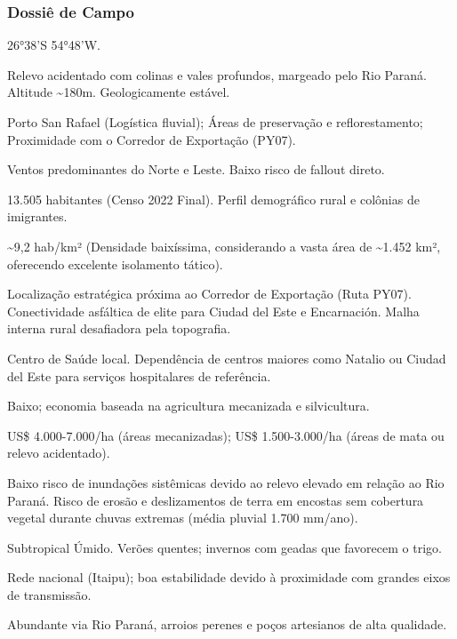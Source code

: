 \subsubsection{Dossiê de Campo}
\begin{description}[style=nextline,leftmargin=0.5cm,font=\bfseries]
\item[Coordenadas]  26°38'S 54°48'W.
\item[Topografia]  Relevo acidentado com colinas e vales profundos, margeado pelo Rio Paraná. Altitude \textasciitilde 180m. Geologicamente estável.
\item[Alvos Estratégicos]  Porto San Rafael (Logística fluvial); Áreas de preservação e reflorestamento; Proximidade com o Corredor de Exportação (PY07).
\item[Fallout]  Ventos predominantes do Norte e Leste. Baixo risco de fallout direto.
\item[População]  13.505 habitantes (Censo 2022 Final). Perfil demográfico rural e colônias de imigrantes.
\item[Densidade]  \textasciitilde 9,2 hab/\allowbreak km² (Densidade baixíssima, considerando a vasta área de \textasciitilde 1.452 km², oferecendo excelente isolamento tático).
\item[Vias de Acesso]  Localização estratégica próxima ao Corredor de Exportação (Ruta PY07). Conectividade asfáltica de elite para Ciudad del Este e Encarnación. Malha interna rural desafiadora pela topografia.
\item[Serviços]  Centro de Saúde local. Dependência de centros maiores como Natalio ou Ciudad del Este para serviços hospitalares de referência.
\item[Custo de Vida]  Baixo; economia baseada na agricultura mecanizada e silvicultura.
\item[Preço da Terra]  US\$ 4.000-7.000/\allowbreak ha (áreas mecanizadas); US\$ 1.500-3.000/\allowbreak ha (áreas de mata ou relevo acidentado).
\item[Hidrologia]  Baixo risco de inundações sistêmicas devido ao relevo elevado em relação ao Rio Paraná. Risco de erosão e deslizamentos de terra em encostas sem cobertura vegetal durante chuvas extremas (média pluvial 1.700 mm/\allowbreak ano).
\item[Clima]  Subtropical Úmido. Verões quentes; invernos com geadas que favorecem o trigo.
\item[Energia]  Rede nacional (Itaipu); boa estabilidade devido à proximidade com grandes eixos de transmissão.
\item[Água]  Abundante via Rio Paraná, arroios perenes e poços artesianos de alta qualidade.

\end{description}
